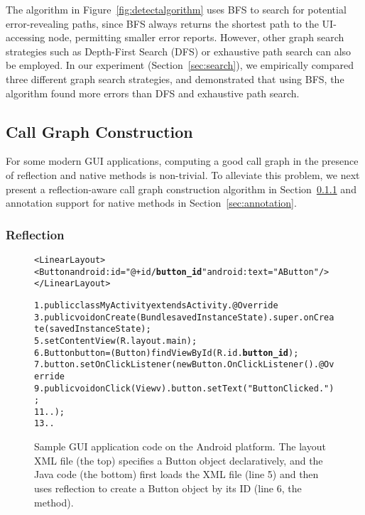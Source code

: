 The algorithm in Figure~\ref{fig:detectalgorithm} uses BFS to search
for potential error-revealing paths, since BFS always returns the
shortest path to the UI-accessing node, permitting
smaller error reports. However,
other graph search strategies such as Depth-First Search (DFS) or
exhaustive path search can also be employed. In our experiment (Section~\ref{sec:search}),
we empirically compared three different graph search strategies, and demonstrated that
using BFS, the algorithm found more errors than DFS and
exhaustive path search.

\tinystep

\subsection{Call Graph Construction}

For some modern GUI applications, computing a good
call graph in the presence of reflection and native methods is non-trivial. 
To alleviate this problem, we next present a reflection-aware call graph
construction algorithm in Section~\ref{sec:cg} and annotation support
for native methods in Section~\ref{sec:annotation}.

\subsubsection{Reflection}
\label{sec:cg}

% 

\begin{figure}[t]
\begin{CodeOut}
\begin{alltt}
<LinearLayout>
    <Button android:id="@+id/\textbf{button\_id}" android:text="A Button" />
</LinearLayout>

1. public class MyActivity extends Activity .    @Override
3.    public void onCreate(Bundle savedInstanceState) .        super.onCreate(savedInstanceState);
5.        setContentView(R.layout.main);
6.        Button button = (Button) findViewById(R.id.\textbf{button\_id});
7.        button.setOnClickListener(new Button.OnClickListener() .            @Override
9.            public void onClick(View v) .               button.setText("Button Clicked.");
11.           .       \ttrcb);
13.   . \ttrcb
\end{alltt}
\end{CodeOut}
\vspace*{-3.0ex} \caption{Sample GUI application code on the Android platform. The layout
XML file (the top) specifies a Button object declaratively, 
and the Java code (the bottom)
first loads the XML file (line 5) and then uses reflection to create
a Button object by its ID (line 6, the  method).}
\label{fig:sampleandroid}
\end{figure}



